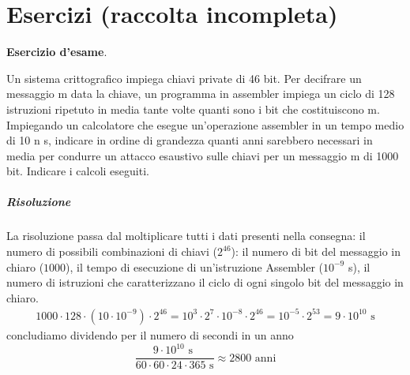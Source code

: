 \chapter{Esercizi (raccolta incompleta)}
\begin{framed}
	\noindent \textbf{Esercizio d'esame}.
	
	\noindent Un sistema crittografico impiega chiavi private di 46 bit. Per decifrare un messaggio m data la
	chiave, un programma in assembler impiega un ciclo di 128 istruzioni ripetuto in media tante volte
	quanti sono i bit che costituiscono m. Impiegando un calcolatore che esegue un’operazione
	assembler in un tempo medio di 10 n s, indicare in ordine di grandezza quanti anni sarebbero
	necessari in media per condurre un attacco esaustivo sulle chiavi per un messaggio m di 1000 bit.
	Indicare i calcoli eseguiti.
	
	\paragraph{Risoluzione} La risoluzione passa dal moltiplicare tutti i dati presenti nella consegna: il numero di possibili combinazioni di chiavi ($2^{46}$): il numero di bit del messaggio in chiaro ($1000$), il tempo di esecuzione di un'istruzione Assembler ($10^{-9}$ s), il numero di istruzioni che caratterizzano il ciclo di ogni singolo bit del messaggio in chiaro. 
	\begin{align*}1000 \cdot 128 \cdot (10 \cdot 10^{-9}) \cdot 2^{46}=10^3 \cdot 2^7 \cdot 10^{-8} \cdot 2^{46}=10^{-5} \cdot 2^{53}=9 \cdot {10}^{10}\text{ s}\end{align*}
	concludiamo dividendo per il numero di secondi in un anno
	$$\frac{9 \cdot 10^{10} \text{ s }}{60 \cdot 60 \cdot 24 \cdot 365\text{ s}} \approx 2800\text{ anni}$$
\end{framed} 


